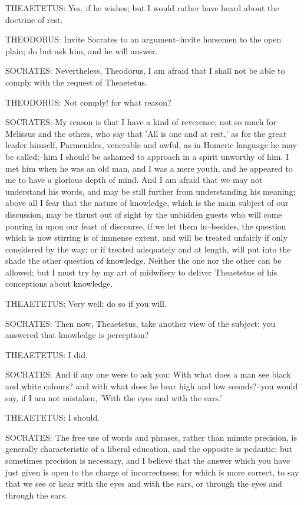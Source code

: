 THEAETETUS: Yes, if he wishes; but I would rather have heard about the
doctrine of rest.

THEODORUS: Invite Socrates to an argument--invite horsemen to the open
plain; do but ask him, and he will answer.

SOCRATES: Nevertheless, Theodorus, I am afraid that I shall not be able
to comply with the request of Theaetetus.

THEODORUS: Not comply! for what reason?

SOCRATES: My reason is that I have a kind of reverence; not so much for
Melissus and the others, who say that 'All is one and at rest,' as for
the great leader himself, Parmenides, venerable and awful, as in Homeric
language he may be called;--him I should be ashamed to approach in a
spirit unworthy of him. I met him when he was an old man, and I was a
mere youth, and he appeared to me to have a glorious depth of mind.
And I am afraid that we may not understand his words, and may be still
further from understanding his meaning; above all I fear that the nature
of knowledge, which is the main subject of our discussion, may be thrust
out of sight by the unbidden guests who will come pouring in upon our
feast of discourse, if we let them in--besides, the question which is
now stirring is of immense extent, and will be treated unfairly if only
considered by the way; or if treated adequately and at length, will put
into the shade the other question of knowledge. Neither the one nor the
other can be allowed; but I must try by my art of midwifery to deliver
Theaetetus of his conceptions about knowledge.

THEAETETUS: Very well; do so if you will.

SOCRATES: Then now, Theaetetus, take another view of the subject: you
answered that knowledge is perception?

THEAETETUS: I did.

SOCRATES: And if any one were to ask you: With what does a man see black
and white colours? and with what does he hear high and low sounds?--you
would say, if I am not mistaken, 'With the eyes and with the ears.'

THEAETETUS: I should.

SOCRATES: The free use of words and phrases, rather than minute
precision, is generally characteristic of a liberal education, and
the opposite is pedantic; but sometimes precision is necessary, and I
believe that the answer which you have just given is open to the charge
of incorrectness; for which is more correct, to say that we see or hear
with the eyes and with the ears, or through the eyes and through the
ears.


